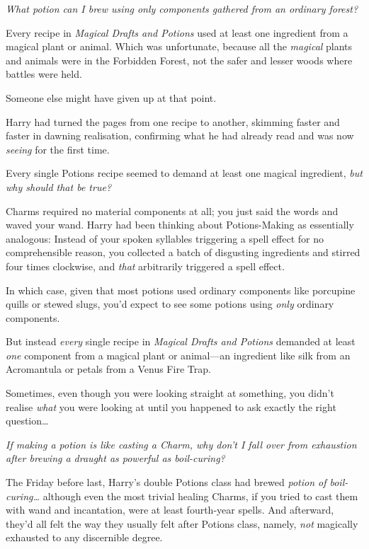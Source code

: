 \emph{What potion can I brew using only components gathered from an
ordinary forest?}

Every recipe in \emph{Magical Drafts and Potions} used at least one
ingredient from a magical plant or animal. Which was unfortunate,
because all the \emph{magical} plants and animals were in the Forbidden
Forest, not the safer and lesser woods where battles were held.

Someone else might have given up at that point.

Harry had turned the pages from one recipe to another, skimming faster
and faster in dawning realisation, confirming what he had already read
and was now \emph{seeing} for the first time.

Every single Potions recipe seemed to demand at least one magical
ingredient, \emph{but why should that be true?}

Charms required no material components at all; you just said the words
and waved your wand. Harry had been thinking about Potions-Making as
essentially analogous: Instead of your spoken syllables triggering a
spell effect for no comprehensible reason, you collected a batch of
disgusting ingredients and stirred four times clockwise, and \emph{that}
arbitrarily triggered a spell effect.

In which case, given that most potions used ordinary components like
porcupine quills or stewed slugs, you'd expect to see some potions using
\emph{only} ordinary components.

But instead \emph{every} single recipe in \emph{Magical Drafts and
Potions} demanded at least \emph{one} component from a magical plant or
animal---an ingredient like silk from an Acromantula or petals from a
Venus Fire Trap.

Sometimes, even though you were looking straight at something, you
didn't realise \emph{what} you were looking at until you happened to ask
exactly the right question\ldots{}

\emph{If making a potion is like casting a Charm, why don't I fall over
from exhaustion after brewing a draught as powerful as boil-curing?}

The Friday before last, Harry's double Potions class had brewed
\emph{potion of boil-curing\ldots{}} although even the most trivial
healing Charms, if you tried to cast them with wand and incantation,
were at least fourth-year spells. And afterward, they'd all felt the way
they usually felt after Potions class, namely, \emph{not} magically
exhausted to any discernible degree.

